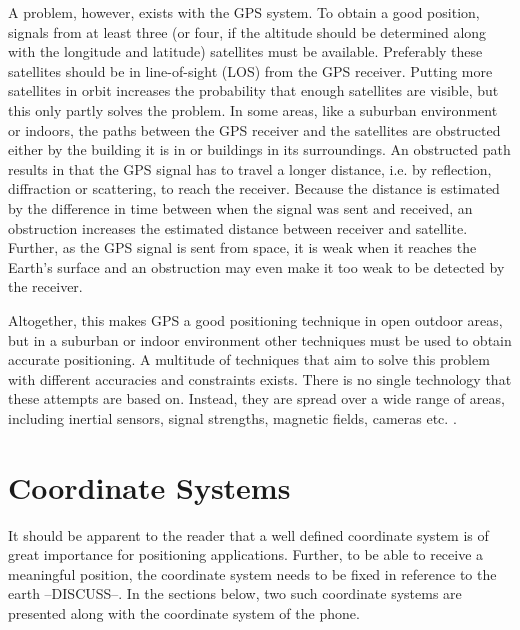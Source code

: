 \documentclass{LTHthesis}
\begin{document}
A problem, however, exists with the GPS system. To obtain a good position, signals from at least three (or four, if the altitude should be determined along with the longitude and latitude) satellites must be available. Preferably these satellites should be in line-of-sight (LOS) from the GPS receiver. Putting more satellites in orbit increases the probability that enough satellites are visible, but this only partly solves the problem. In some areas, like a suburban environment or indoors, the paths between the GPS receiver and the satellites are obstructed either by the building it is in or buildings in its surroundings. An obstructed path results in that the GPS signal has to travel a longer distance, i.e. by reflection, diffraction or scattering, to reach the receiver. Because the distance is estimated by the difference in time between when the signal was sent and received, an obstruction increases the estimated distance between receiver and satellite. Further, as the GPS signal is sent from space, it is weak when it reaches the Earth's surface and an obstruction may even make it too weak to be detected by the receiver.

Altogether, this makes GPS a good positioning technique in open outdoor areas, but in a suburban or indoor environment other techniques must be used to obtain accurate positioning. A multitude of techniques that aim to solve this problem with different accuracies and constraints exists. There is no single technology that these attempts are based on. Instead, they are spread over a wide range of areas, including inertial sensors, signal strengths, magnetic fields, cameras etc. \cite{positioning_overview}. 
%
\section{Coordinate Systems}
It should be apparent to the reader that a well defined coordinate system is of great importance for positioning applications. Further, to be able to receive a meaningful position, the coordinate system needs to be fixed in reference to the earth --DISCUSS--. In the sections below, two such coordinate systems are presented along with the coordinate system of the phone. 
\end{document}
